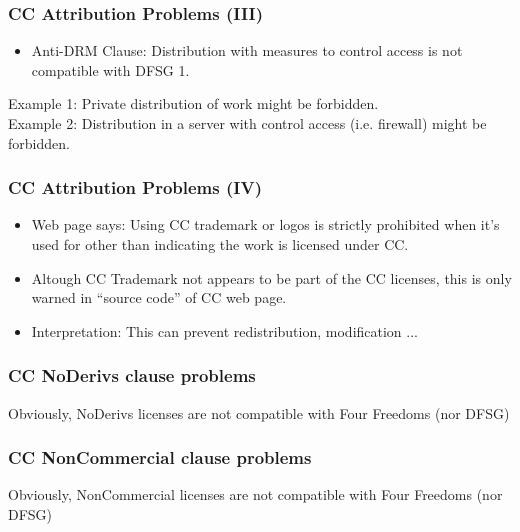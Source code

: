 \begin{frame}
\frametitle{CC Attribution Problems (III)}

\begin{itemize}
\item Anti-DRM Clause: Distribution with measures to control access is not compatible with DFSG 1.
\end{itemize}

Example 1: Private distribution of work might be forbidden.\\
Example 2: Distribution in a server with control access (i.e. firewall) might be forbidden.
\end{frame}


\begin{frame}
\frametitle{CC Attribution Problems (IV)}

\begin{itemize}
\item Web page says: Using CC trademark or logos is strictly prohibited when it's used for other than indicating the work is licensed under CC.
\item Altough CC Trademark not appears to be part of the CC licenses, this is only warned in ``source code'' of CC web page.
\item Interpretation: This can prevent redistribution, modification ...
\end{itemize}

\end{frame}


\begin{frame}
\frametitle{CC NoDerivs clause problems}

\LARGE{Obviously, NoDerivs licenses are not compatible with Four Freedoms (nor DFSG)}

\end{frame}


\begin{frame}
\frametitle{CC NonCommercial clause problems}

\LARGE{Obviously, NonCommercial licenses are not compatible with Four Freedoms (nor DFSG)}

\end{frame}

